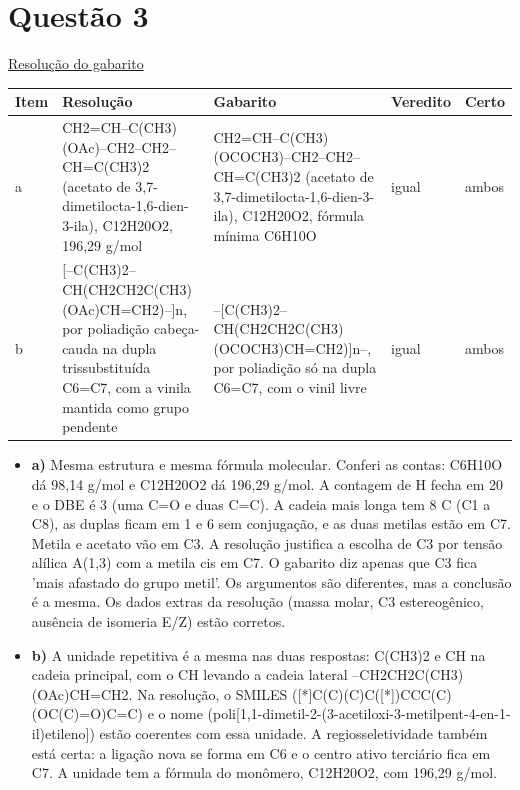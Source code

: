 \documentclass{article}%
\begin{document}
\section*{Questão 3}%
\href{https://poliedroresolve.sistemapoliedro.com.br/vestibulares/ime/2026/ime-2-fase-dia-3-25-10-2025-2-fase-dia-3/dissertativa-3-quimica-2-fase-dia-3-ime-2026}{Resolução do gabarito}\par\smallskip%
\begin{longtable}{@{}p{} p{} p{} p{} p{}@{}}\toprule Item & Resolução & Gabarito & Veredito & Certo \\ \midrule
a & CH2=CH--C(CH3)(OAc)--CH2--CH2--CH=C(CH3)2 (acetato de 3,7{-}dimetilocta{-}1,6{-}dien{-}3{-}ila), C12H20O2, 196,29 g/mol & CH2=CH--C(CH3)(OCOCH3)--CH2--CH2--CH=C(CH3)2 (acetato de 3,7{-}dimetilocta{-}1,6{-}dien{-}3{-}ila), C12H20O2, fórmula mínima C6H10O & igual & ambos \\
b & {[}--C(CH3)2--CH(CH2CH2C(CH3)(OAc)CH=CH2)--{]}n, por poliadição cabeça{-}cauda na dupla trissubstituída C6=C7, com a vinila mantida como grupo pendente & --{[}C(CH3)2--CH(CH2CH2C(CH3)(OCOCH3)CH=CH2){]}n--, por poliadição só na dupla C6=C7, com o vinil livre & igual & ambos \\
\bottomrule\end{longtable}%
\begin{itemize}%
\item%
\textbf{a)} Mesma estrutura e mesma fórmula molecular. Conferi as contas: C6H10O dá 98,14 g/mol e C12H20O2 dá 196,29 g/mol. A contagem de H fecha em 20 e o DBE é 3 (uma C=O e duas C=C). A cadeia mais longa tem 8 C (C1 a C8), as duplas ficam em 1 e 6 sem conjugação, e as duas metilas estão em C7. Metila e acetato vão em C3. A resolução justifica a escolha de C3 por tensão alílica A(1,3) com a metila cis em C7. O gabarito diz apenas que C3 fica 'mais afastado do grupo metil'. Os argumentos são diferentes, mas a conclusão é a mesma. Os dados extras da resolução (massa molar, C3 estereogênico, ausência de isomeria E/Z) estão corretos.%
\item%
\textbf{b)} A unidade repetitiva é a mesma nas duas respostas: C(CH3)2 e CH na cadeia principal, com o CH levando a cadeia lateral --CH2CH2C(CH3)(OAc)CH=CH2. Na resolução, o SMILES ({[}*{]}C(C)(C)C({[}*{]})CCC(C)(OC(C)=O)C=C) e o nome (poli{[}1,1{-}dimetil{-}2{-}(3{-}acetiloxi{-}3{-}metilpent{-}4{-}en{-}1{-}il)etileno{]}) estão coerentes com essa unidade. A regiosseletividade também está certa: a ligação nova se forma em C6 e o centro ativo terciário fica em C7. A unidade tem a fórmula do monômero, C12H20O2, com 196,29 g/mol.%
\end{itemize}%
\end{document}
